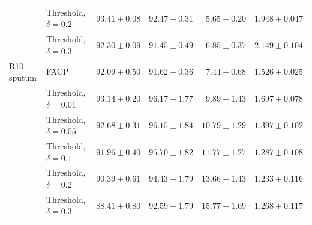 \begin{tabular}{@{}llrrrr@{}}
 & Threshold, $\delta=0.2$ & $93.41 \pm 0.08$ & $92.47 \pm 0.31$ & $5.65 \pm 0.20$ & $1.948 \pm 0.047$\\
 & Threshold, $\delta=0.3$ & $92.30 \pm 0.09$ & $91.45 \pm 0.49$ & $6.85 \pm 0.37$ & $2.149 \pm 0.104$\\
\addlinespace
R10 sputum & FACP & $92.09 \pm 0.50$ & $91.62 \pm 0.36$ & $\mathbf{7.44 \pm 0.68}$ & $1.526 \pm 0.025$\\
 & Threshold, $\delta=0.01$ & $\mathbf{93.14 \pm 0.20}$ & $\mathbf{96.17 \pm 1.77}$ & $9.89 \pm 1.43$ & $1.697 \pm 0.078$\\
 & Threshold, $\delta=0.05$ & $92.68 \pm 0.31$ & $96.15 \pm 1.84$ & $10.79 \pm 1.29$ & $1.397 \pm 0.102$\\
 & Threshold, $\delta=0.1$ & $91.96 \pm 0.40$ & $95.70 \pm 1.82$ & $11.77 \pm 1.27$ & $1.287 \pm 0.108$\\
 & Threshold, $\delta=0.2$ & $90.39 \pm 0.61$ & $94.43 \pm 1.79$ & $13.66 \pm 1.43$ & $\mathbf{1.233 \pm 0.116}$\\
 & Threshold, $\delta=0.3$ & $88.41 \pm 0.80$ & $92.59 \pm 1.79$ & $15.77 \pm 1.69$ & $1.268 \pm 0.117$\\
\bottomrule
\end{tabular}
\endgroup
